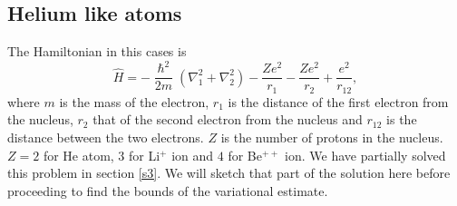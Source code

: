 \documentclass{article}
\numberwithin{equation}{section}
\begin{document}
\subsection{Helium like atoms}
The Hamiltonian in this cases is
\begin{equation}\label{s5e48}
\hat{H} = -\frac{\hslash^2}{2m}\left(\nabla_1^2 + \nabla_2^2\right) -
\frac{Ze^2}{r_1} - \frac{Ze^2}{r_2} + \frac{e^2}{r_{12}},
\end{equation}
where $m$ is the mass of the electron, $r_1$ is the distance of the first
electron from the nucleus, $r_2$ that of the second electron from the 
nucleus and $r_{12}$ is the distance between the two electrons. $Z$ is the
number of protons in the nucleus. $Z = 2$ for He atom, $3$ for Li$^+$ ion
and $4$ for Be$^{++}$ ion. We have partially solved this problem in section
\ref{s3}. We will sketch that part of the solution here before proceeding
to find the bounds of the variational estimate.
\end{document}

